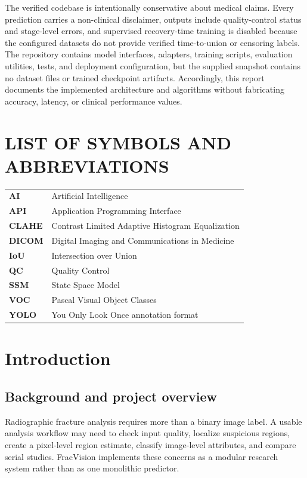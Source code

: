 \documentclass[12pt,a4paper]{article}
\begin{document}
The verified codebase is intentionally conservative about medical claims. Every prediction carries a non-clinical disclaimer, outputs include quality-control status and stage-level errors, and supervised recovery-time training is disabled because the configured datasets do not provide verified time-to-union or censoring labels. The repository contains model interfaces, adapters, training scripts, evaluation utilities, tests, and deployment configuration, but the supplied snapshot contains no dataset files or trained checkpoint artifacts. Accordingly, this report documents the implemented architecture and algorithms without fabricating accuracy, latency, or clinical performance values.

\fi
\newpage
\begingroup
\hypersetup{linkcolor=black}
\tableofcontents
\endgroup
\newpage
\begingroup
\hypersetup{linkcolor=black}
\listoffigures
\endgroup
\newpage
\begingroup
\hypersetup{linkcolor=black}
\listoftables
\endgroup
\newpage
\section*{LIST OF SYMBOLS AND ABBREVIATIONS}
\begin{tabularx}{\textwidth}{>{\bfseries}lX}
AI & Artificial Intelligence\\
API & Application Programming Interface\\
CLAHE & Contrast Limited Adaptive Histogram Equalization\\
DICOM & Digital Imaging and Communications in Medicine\\
IoU & Intersection over Union\\
QC & Quality Control\\
SSM & State Space Model\\
VOC & Pascal Visual Object Classes\\
YOLO & You Only Look Once annotation format
\end{tabularx}

\clearpage
{}
\section{Introduction}
\subsection{Background and project overview}
Radiographic fracture analysis requires more than a binary image label. A usable analysis workflow may need to check input quality, localize suspicious regions, create a pixel-level region estimate, classify image-level attributes, and compare serial studies. FracVision implements these concerns as a modular research system rather than as one monolithic predictor.
\end{document}
